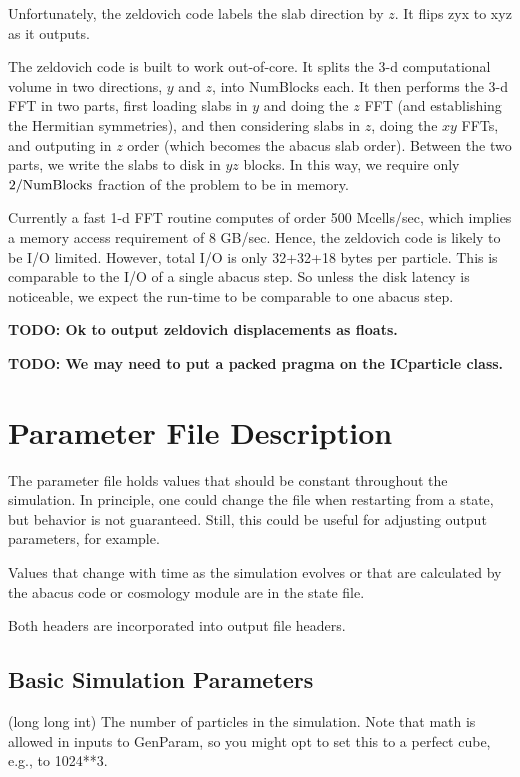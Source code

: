\documentclass[11pt,preprint]{aastex}
\newcommand{\param}[2]{\medskip\noindent{\bf #1:} (#2) }
\newcommand{\todo}[1]{{\bf TODO: #1}}
\begin{document}
Unfortunately, the zeldovich code labels the slab direction by $z$.
It flips zyx to xyz as it outputs.

The zeldovich code is built to work out-of-core.  It splits the 3-d
computational volume in two directions, $y$ and $z$, into NumBlocks
each.  It then performs the 3-d FFT in two parts, first loading
slabs in $y$ and doing the $z$ FFT (and establishing the Hermitian
symmetries), and then considering slabs in $z$, doing the $xy$ FFTs,
and outputing in $z$ order (which becomes the abacus slab order).
Between the two parts, we write the slabs to disk in $yz$ blocks.
In this way, we require only $2/{\rm NumBlocks}$ fraction of the
problem to be in memory.

Currently a fast 1-d FFT routine computes of order 500 Mcells/sec,
which implies a memory access requirement of 8 GB/sec.  Hence, the
zeldovich code is likely to be I/O limited.  However, total I/O is 
only 32+32+18 bytes per particle.  This is comparable to the I/O 
of a single abacus step.  So unless the disk latency is noticeable,
we expect the run-time to be comparable to one abacus step.

\todo{Ok to output zeldovich displacements as floats.}

\todo{We may need to put a packed pragma on the ICparticle class.}

\section{Parameter File Description}

The parameter file holds values that should be constant throughout the
simulation.  In principle, one could change the file when restarting
from a state, but behavior is not guaranteed.  Still, this could be
useful for adjusting output parameters, for example.

Values that change with time as the simulation evolves or that are 
calculated by the abacus code or cosmology module are in the state
file.

Both headers are incorporated into output file headers. 

\subsection{Basic Simulation Parameters}

\param{NP}{long long int} The number of particles in the simulation.
Note that math is allowed in inputs to GenParam, so you might opt to
set this to a perfect cube, e.g., to 1024**3.
\end{document}
